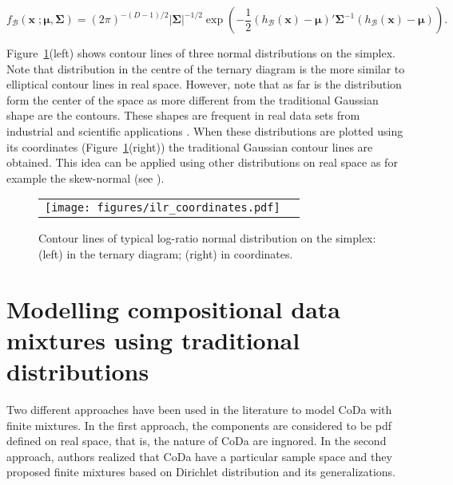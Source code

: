 \documentclass[12pt, a4paper]{article}
\newcommand{\m}[1]{\boldsymbol{#1}}
\begin{document}
\begin{equation}\label{eq:densSNormal}
f_\mathcal{B}(\mathbf{x}\;; \m\mu, \m\Sigma) =(2\pi)^{-(D-1)/2} |\mathbf{\Sigma}|^{-1/2} \exp \left( -{\frac{1}{2}} \left(h_\mathcal{B}(\textbf{x})- \m\mu \right)' \mathbf{\Sigma}^{-1} \left( h_\mathcal{B}(\textbf{x})- \m\mu \right)\right).
\end{equation}

Figure~\ref{fig01}(left) shows  contour lines of three normal distributions on the simplex. Note that distribution in the centre of the ternary diagram is the more similar to elliptical contour lines in real space. However, note that as far is
the distribution form the center of the space as more different from the traditional Gaussian shape are the contours. These shapes are frequent in real data sets from industrial and scientific applications \citep{buccianti2011natural,vives2014individual}.
When these distributions are plotted using its coordinates (Figure~\ref{fig01}(right)) the traditional Gaussian contour lines are obtained. This idea can be applied using other distributions on real space as for example the skew-normal (see \cite{mateu2007skew}).


\begin{figure}[thbp]
\begin{center}
\begin{tabular}{cc}
  \texttt{[image: figures/ilr\_coordinates.pdf]} \\
 \end{tabular}
 \caption{Contour lines of typical log-ratio normal distribution on the simplex: (left) in the ternary diagram; (right) in coordinates. }\label{fig01}
\end{center}
\end{figure}



\section{Modelling compositional data mixtures using traditional distributions}
\label{standard_section}

\noindent Two different approaches have been used in the literature to model CoDa with finite mixtures. 
In the first approach,  the components are considered to be pdf defined on real space, that is, the nature of CoDa are ingnored. In the second approach,  authors realized that CoDa have a particular sample space and they proposed finite mixtures based on Dirichlet distribution and its generalizations.
\end{document}
